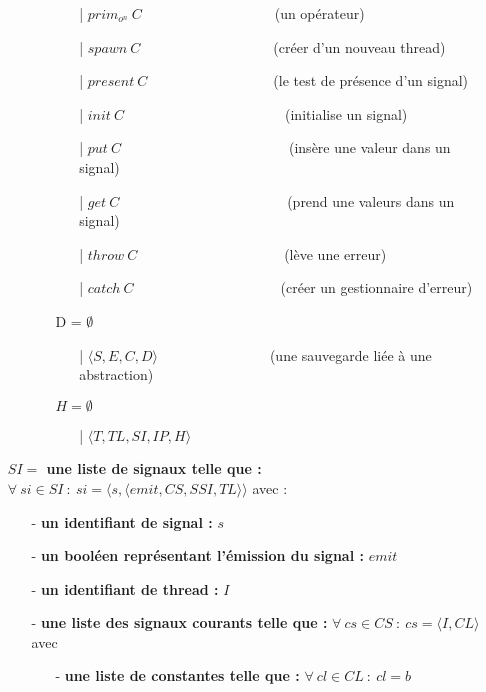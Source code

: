 \documentclass[10pt,a4paper]{report}
\begin{document}
\begin{itemize}
\begin{itemize}
\begin{itemize}
\begin{itemize}
					\item[|] $prim_{o^{n}}~C$~~~~~~~~~~~~~~~~~~~(un opérateur)
					\item[|] $spawn~C$~~~~~~~~~~~~~~~~~~~(créer d'un nouveau thread)
					\item[|] $present~C$~~~~~~~~~~~~~~~~~~(le test de présence d'un signal)
					\item[|] $init~C$~~~~~~~~~~~~~~~~~~~~~~~(initialise un signal)
					\item[|] $put~C$~~~~~~~~~~~~~~~~~~~~~~~~(insère une valeur dans un signal)
					\item[|] $get~C$~~~~~~~~~~~~~~~~~~~~~~~~(prend une valeurs dans un signal)
					\item[|] $throw~C$~~~~~~~~~~~~~~~~~~~~~(lève une erreur)
					\item[|] $catch~C$~~~~~~~~~~~~~~~~~~~~~(créer un gestionnaire d'erreur)
					
				\end{itemize}
				\item[] D = $\emptyset$
				\begin{itemize}
					\item[|] $\langle S,E,C,D\rangle$~~~~~~~~~~~~~~~~(une sauvegarde liée à une abstraction)
				\end{itemize}
				\item[] $H = \emptyset$
				\begin{itemize}
					\item[|] $\langle T,TL,SI,IP,H\rangle$
				\end{itemize}
			\end{itemize}	
		\end{itemize}
		
		\item[]
		\item[] \textbf{$SI =$ une liste de signaux telle que :} $\forall~si \in SI~:~si = \langle s,\langle emit,CS,SSI,TL\rangle\rangle$ avec :
		\begin{itemize}
			\item[] - \textbf{un identifiant de signal :} $s$
			\item[] - \textbf{un booléen représentant l'émission du signal :} $emit$
			\item[] - \textbf{un identifiant de thread :} $I$
			\item[] - \textbf{une liste des signaux courants telle que :} $\forall~cs \in CS~:~cs = \langle I,CL\rangle$ avec 
			\begin{itemize}
				\item[] - \textbf{une liste de constantes telle que :} $\forall~cl \in CL~:~cl = b$
			\end{itemize}
			

\end{itemize}
\end{itemize}
\end{document}
